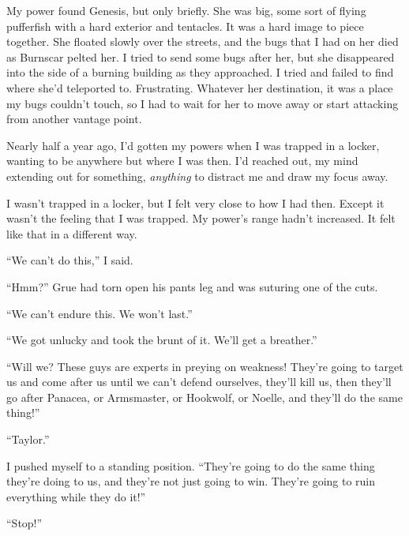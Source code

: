 My power found Genesis, but only briefly.  She was big, some sort of flying pufferfish with a hard exterior and tentacles.  It was a hard image to piece together.  She floated slowly over the streets, and the bugs that I had on her died as Burnscar pelted her.  I tried to send some bugs after her, but she disappeared into the side of a burning building as they approached.  I tried and failed to find where she'd teleported to.  Frustrating.  Whatever her destination, it was a place my bugs couldn't touch, so I had to wait for her to move away or start attacking from another vantage point.



Nearly half a year ago, I'd gotten my powers when I was trapped in a locker, wanting to be anywhere but where I was then.  I'd reached out, my mind extending out for something, \emph{anything} to distract me and draw my focus away.



I wasn't trapped in a locker, but I felt very close to how I had then.  Except it wasn't the feeling that I was trapped.  My power's range hadn't increased.  It felt like that in a different way.



``We can't do this,'' I said.



``Hmm?''  Grue had torn open his pants leg and was suturing one of the cuts.



``We can't endure this.  We won't last.''



``We got unlucky and took the brunt of it.  We'll get a breather.''



``Will we?  These guys are experts in preying on weakness!  They're going to target us and come after us until we can't defend ourselves, they'll kill us, then they'll go after Panacea, or Armsmaster, or Hookwolf, or Noelle, and they'll do the same thing!''



``Taylor.''



I pushed myself to a standing position.  ``They're going to do the same thing they're doing to us, and they're not just going to win.  They're going to ruin everything while they do it!''



``Stop!''



